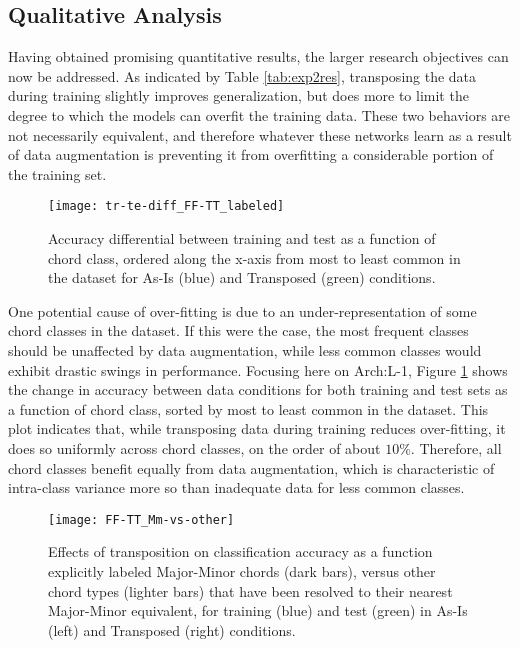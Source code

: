 \subsection{Qualitative Analysis}
\label{subsec:Qualitative_analysis}

Having obtained promising quantitative results, the larger research objectives can now be addressed.
As indicated by Table \ref{tab:exp2res}, transposing the data during training slightly improves generalization, but does more to limit the degree to which the models can overfit the training data.
These two behaviors are not necessarily equivalent, and therefore whatever these networks learn as a result of data augmentation is preventing it from overfitting a considerable portion of the training set.

\begin{figure}[!t]
\centering
 \centerline{\texttt{[image: tr-te-diff\_FF-TT\_labeled]}}
\caption{Accuracy differential between training and test as a function of chord class, ordered along the x-axis from most to least common in the dataset for As-Is (blue) and Transposed (green) conditions.}
\label{fig:classes}
\end{figure}

One potential cause of over-fitting is due to an under-representation of some chord classes in the dataset.
If this were the case, the most frequent classes should be unaffected by data augmentation, while less common classes would exhibit drastic swings in performance.
Focusing here on Arch:L-1, Figure \ref{fig:classes} shows the change in accuracy between data conditions for both training and test sets as a function of chord class, sorted by most to least common in the dataset.
This plot indicates that, while transposing data during training reduces over-fitting, it does so uniformly across chord classes, on the order of about $10\%$.
Therefore, all chord classes benefit equally from data augmentation, which is characteristic of intra-class variance more so than inadequate data for less common classes.

\begin{figure}[!t]
\centering
\texttt{[image: FF-TT\_Mm-vs-other]}
\caption{Effects of transposition on classification accuracy as a function explicitly labeled Major-Minor chords (dark bars), versus other chord types (lighter bars) that have been resolved to their nearest Major-Minor equivalent, for training (blue) and test (green) in As-Is (left) and Transposed (right) conditions.}
\label{fig:strict_vs_others}
\end{figure}

